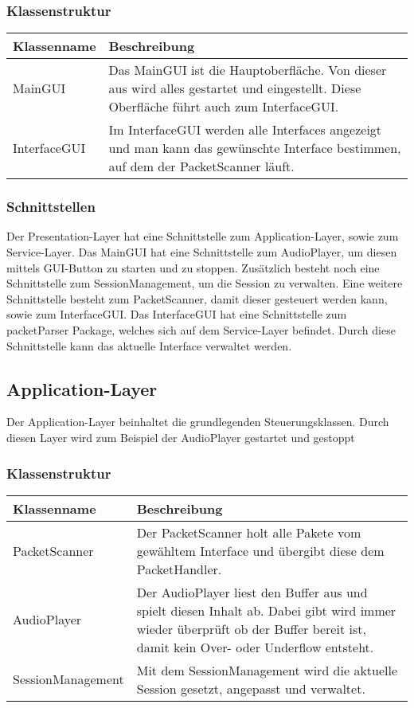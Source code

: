 \documentclass[a4,12pt]{scrartcl}
\begin{document}
\subsubsection{Klassenstruktur}

\begin{table}[H]
\centering
    \begin{tabular}{@{}l p{11cm} @{}}\toprule    
    {Klassenname} & {Beschreibung}\\ \midrule
    MainGUI & Das MainGUI ist die Hauptoberfläche. Von dieser aus wird alles gestartet und eingestellt. Diese Oberfläche führt auch zum InterfaceGUI. \\ \addlinespace
        InterfaceGUI & Im InterfaceGUI werden alle Interfaces angezeigt und man kann das gewünschte Interface bestimmen, auf dem der PacketScanner läuft. \\
    \bottomrule
    \end{tabular}
\end{table}
\subsubsection{Schnittstellen}
Der Presentation-Layer hat eine Schnittstelle zum Application-Layer, sowie zum Service-Layer. 
Das MainGUI hat eine Schnittstelle zum AudioPlayer, um diesen mittels GUI-Button zu starten und zu stoppen.
Zusätzlich besteht noch eine Schnittstelle zum SessionManagement, um die Session zu verwalten.
Eine weitere Schnittstelle besteht zum PacketScanner, damit dieser gesteuert werden kann, sowie zum InterfaceGUI.
Das InterfaceGUI hat eine Schnittstelle zum packetParser Package, welches sich auf dem Service-Layer befindet. Durch diese Schnittstelle kann das aktuelle Interface verwaltet werden.

\subsection{Application-Layer}
Der Application-Layer beinhaltet die grundlegenden Steuerungsklassen. Durch diesen Layer wird zum Beispiel der AudioPlayer gestartet und gestoppt
\subsubsection{Klassenstruktur}
\begin{table}[H]
\centering
    \begin{tabular}{@{}l p{10cm} @{}}\toprule    
    {Klassenname} & {Beschreibung}\\ \midrule
     PacketScanner& Der PacketScanner holt alle Pakete vom gewähltem Interface und übergibt diese dem PacketHandler. \\ \addlinespace
    AudioPlayer& Der AudioPlayer liest den 
    Buffer aus und spielt diesen Inhalt ab. Dabei gibt wird immer wieder überprüft ob der Buffer bereit ist, damit kein Over- oder Underflow entsteht. \\ \addlinespace
    SessionManagement&  Mit dem SessionManagement wird die aktuelle Session gesetzt, angepasst und verwaltet.\\ 
     
    \bottomrule
    \end{tabular}
\end{table}
\end{document}
